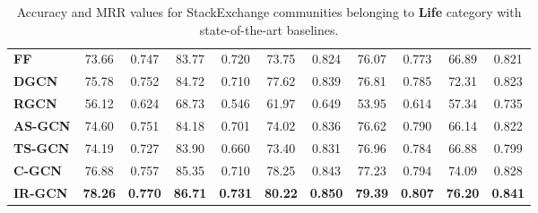\documentclass[smallcondensed]{svjour3}     %
\begin{document}
\begin{table}[h]
\begin{tabular}{l|c c|c c|c c|c c|c c}
        \textbf{FF~\cite{JendersKN16}}&73.66&0.747&83.77&0.720&73.75&0.824&76.07&0.773&66.89&0.821\\

        \textbf{DGCN~\cite{DualGCN}}&75.78&0.752&84.72&0.710&77.62&0.839&76.81&0.785&72.31&0.823\\

        \textbf{RGCN~\cite{relationalGCN}}&56.12&0.624&68.73&0.546&61.97&0.649&53.95&0.614&57.34&0.735\\
        \cmidrule(lr){1-1}\cmidrule(lr){2-11}%
        \textbf{AS-GCN}&74.60&0.751&84.18&0.701&74.02&0.836&76.62&0.790&66.14&0.822\\

        \textbf{TS-GCN}&74.19&0.727&83.90&0.660&73.40&0.831&76.96&0.784&66.88&0.799\\

        \textbf{C-GCN}&76.88&0.757&85.35&0.710&78.25&0.843&77.23&0.794&74.09&0.828\\

        \textbf{IR-GCN}&\textbf{78.26}&\textbf{0.770}&\textbf{86.71}&\textbf{0.731}&\textbf{80.22}&\textbf{0.850}&\textbf{79.39}&\textbf{0.807}&\textbf{76.20}&\textbf{0.841}\\

      \bottomrule
    \end{tabular}
  \caption{\label{tab:stackacc3} Accuracy and MRR values for StackExchange communities belonging to \textbf{Life} category with state-of-the-art baselines.}
\end{table}
\end{document}
